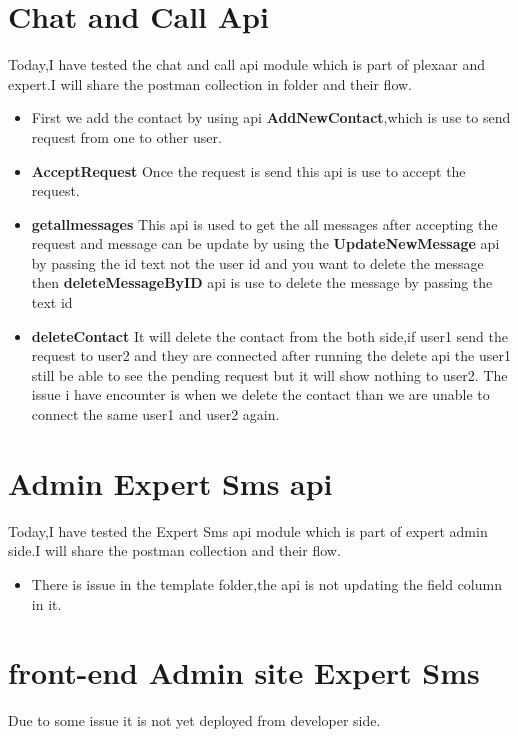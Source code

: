 \documentclass[12pt,a4paper]{article}
\begin{document}
	
 
 \clearpage
\section{Chat and Call Api}
Today,I have tested the chat and call api module which is part of plexaar and expert.I will share the postman collection in folder and their flow.
\begin{itemize}
    \item First we add the contact by using api \textbf{AddNewContact},which is use to send request from one to other user.
    \item \textbf{AcceptRequest} Once the request is send this api is use to accept the request.
    \item \textbf{getallmessages} This api is used to get the all messages after accepting the request and message can be update by using the \textbf{UpdateNewMessage} api by passing the id text not the user id and you want to delete the message then \textbf{deleteMessageByID} api is use to delete the message by passing the text id
    \item \textbf{deleteContact} It will delete the contact from the both side,if user1 send the request to user2 and they are connected after running the delete api the user1 still be able to see the pending request but it will show nothing to user2.
    \newline The issue i have encounter is when we delete the contact than we are unable to connect the same user1 and user2 again.
\end{itemize}
\section{Admin Expert Sms api}
Today,I have tested the Expert Sms api module which is part of expert admin side.I will share the postman collection and their flow.
\begin{itemize}
    \item There is issue in the template folder,the api is not updating the field column in it.
\end{itemize}
\section{front-end Admin site Expert Sms}
Due to some issue it is not yet deployed from developer side.
\end{document}
